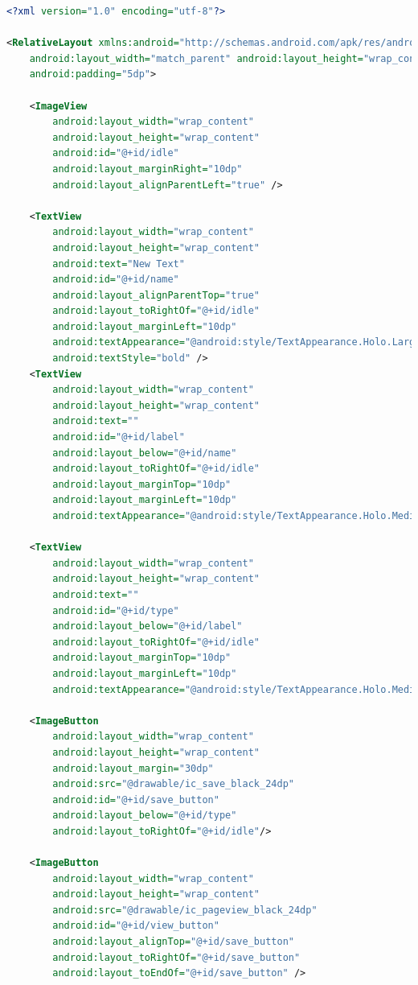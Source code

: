 \begin{lstlisting}[language=XML,caption={Vista XML en android},label={lst:xml_view}]
<?xml version="1.0" encoding="utf-8"?>

<RelativeLayout xmlns:android="http://schemas.android.com/apk/res/android"
    android:layout_width="match_parent" android:layout_height="wrap_content"
    android:padding="5dp">

    <ImageView
        android:layout_width="wrap_content"
        android:layout_height="wrap_content"
        android:id="@+id/idle"
        android:layout_marginRight="10dp"
        android:layout_alignParentLeft="true" />

    <TextView
        android:layout_width="wrap_content"
        android:layout_height="wrap_content"
        android:text="New Text"
        android:id="@+id/name"
        android:layout_alignParentTop="true"
        android:layout_toRightOf="@+id/idle"
        android:layout_marginLeft="10dp"
        android:textAppearance="@android:style/TextAppearance.Holo.Large"
        android:textStyle="bold" />
    <TextView
        android:layout_width="wrap_content"
        android:layout_height="wrap_content"
        android:text=""
        android:id="@+id/label"
        android:layout_below="@+id/name"
        android:layout_toRightOf="@+id/idle"
        android:layout_marginTop="10dp"
        android:layout_marginLeft="10dp"
        android:textAppearance="@android:style/TextAppearance.Holo.Medium" />

    <TextView
        android:layout_width="wrap_content"
        android:layout_height="wrap_content"
        android:text=""
        android:id="@+id/type"
        android:layout_below="@+id/label"
        android:layout_toRightOf="@+id/idle"
        android:layout_marginTop="10dp"
        android:layout_marginLeft="10dp"
        android:textAppearance="@android:style/TextAppearance.Holo.Medium" />

    <ImageButton
        android:layout_width="wrap_content"
        android:layout_height="wrap_content"
        android:layout_margin="30dp"
        android:src="@drawable/ic_save_black_24dp"
        android:id="@+id/save_button"
        android:layout_below="@+id/type"
        android:layout_toRightOf="@+id/idle"/>

    <ImageButton
        android:layout_width="wrap_content"
        android:layout_height="wrap_content"
        android:src="@drawable/ic_pageview_black_24dp"
        android:id="@+id/view_button"
        android:layout_alignTop="@+id/save_button"
        android:layout_toRightOf="@+id/save_button"
        android:layout_toEndOf="@+id/save_button" />


\end{lstlisting}
